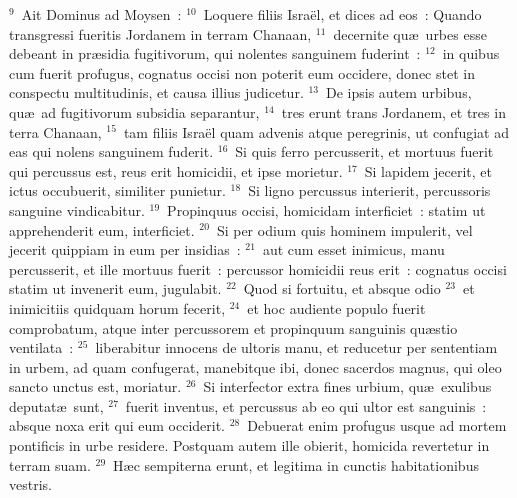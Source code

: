 ${}^{9}$~Ait Dominus ad Moysen~:
${}^{10}$~Loquere filiis Isra\"el, et dices ad eos~: Quando transgressi fueritis Jordanem in terram Chanaan,
${}^{11}$~decernite qu\ae\ urbes esse debeant in pr\ae sidia fugitivorum, qui nolentes sanguinem fuderint~:
${}^{12}$~in quibus cum fuerit profugus, cognatus occisi non poterit eum occidere, donec stet in conspectu multitudinis, et causa illius judicetur.
${}^{13}$~De ipsis autem urbibus, qu\ae\ ad fugitivorum subsidia separantur,
${}^{14}$~tres erunt trans Jordanem, et tres in terra Chanaan,
${}^{15}$~tam filiis Isra\"el quam advenis atque peregrinis, ut confugiat ad eas qui nolens sanguinem fuderit.
${}^{16}$~Si quis ferro percusserit, et mortuus fuerit qui percussus est, reus erit homicidii, et ipse morietur.
${}^{17}$~Si lapidem jecerit, et ictus occubuerit, similiter punietur.
${}^{18}$~Si ligno percussus interierit, percussoris sanguine vindicabitur.
${}^{19}$~Propinquus occisi, homicidam interficiet~: statim ut apprehenderit eum, interficiet.
${}^{20}$~Si per odium quis hominem impulerit, vel jecerit quippiam in eum per insidias~:
${}^{21}$~aut cum esset inimicus, manu percusserit, et ille mortuus fuerit~: percussor homicidii reus erit~: cognatus occisi statim ut invenerit eum, jugulabit.
${}^{22}$~Quod si fortuitu, et absque odio
${}^{23}$~et inimicitiis quidquam horum fecerit,
${}^{24}$~et hoc audiente populo fuerit comprobatum, atque inter percussorem et propinquum sanguinis qu\ae stio ventilata~:
${}^{25}$~liberabitur innocens de ultoris manu, et reducetur per sententiam in urbem, ad quam confugerat, manebitque ibi, donec sacerdos magnus, qui oleo sancto unctus est, moriatur.
${}^{26}$~Si interfector extra fines urbium, qu\ae\ exulibus deputat\ae\ sunt,
${}^{27}$~fuerit inventus, et percussus ab eo qui ultor est sanguinis~: absque noxa erit qui eum occiderit.
${}^{28}$~Debuerat enim profugus usque ad mortem pontificis in urbe residere. Postquam autem ille obierit, homicida revertetur in terram suam.
${}^{29}$~H\ae c sempiterna erunt, et legitima in cunctis habitationibus vestris.


